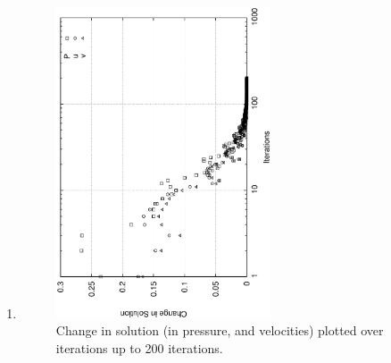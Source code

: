 \documentclass[a4paper, 10pt]{article}
\begin{document}
\begin{enumerate}[I]
  
\item
  
  \begin{figure}
    \centering
    \includegraphics[width=0.6\textwidth, angle = -90]{../plot/stability/convergence/conv.eps}
    \caption{Change in solution (in pressure, and velocities) plotted over iterations up to 200 iterations.}
    \label{ch1}
    \end{figure}
  

\end{enumerate}
\end{document}
